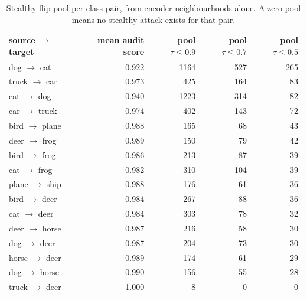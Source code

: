 \begin{table}[t]
\centering
\small
\begin{tabular}{lrrrr}
\toprule
source $\to$ target & mean audit score & pool $\tau \le 0.9$ & pool $\tau \le 0.7$ & pool $\tau \le 0.5$ \\
\midrule
dog $\to$ cat & 0.922 & 1164 & 527 & 265 \\
truck $\to$ car & 0.973 & 425 & 164 & 83 \\
cat $\to$ dog & 0.940 & 1223 & 314 & 82 \\
car $\to$ truck & 0.974 & 402 & 143 & 72 \\
bird $\to$ plane & 0.988 & 165 & 68 & 43 \\
deer $\to$ frog & 0.989 & 150 & 79 & 42 \\
bird $\to$ frog & 0.986 & 213 & 87 & 39 \\
cat $\to$ frog & 0.982 & 310 & 104 & 39 \\
plane $\to$ ship & 0.988 & 176 & 61 & 36 \\
bird $\to$ deer & 0.984 & 267 & 88 & 36 \\
cat $\to$ deer & 0.984 & 303 & 78 & 32 \\
deer $\to$ horse & 0.987 & 216 & 58 & 30 \\
dog $\to$ deer & 0.987 & 204 & 73 & 30 \\
horse $\to$ deer & 0.989 & 174 & 61 & 29 \\
dog $\to$ horse & 0.990 & 156 & 55 & 28 \\
truck $\to$ deer & 1.000 & 8 & 0 & 0 \\
\bottomrule
\end{tabular}
\caption{Stealthy flip pool per class pair, from encoder neighbourhoods alone. A zero pool means no stealthy attack exists for that pair.}
\label{tab:pair_stealth}
\end{table}

